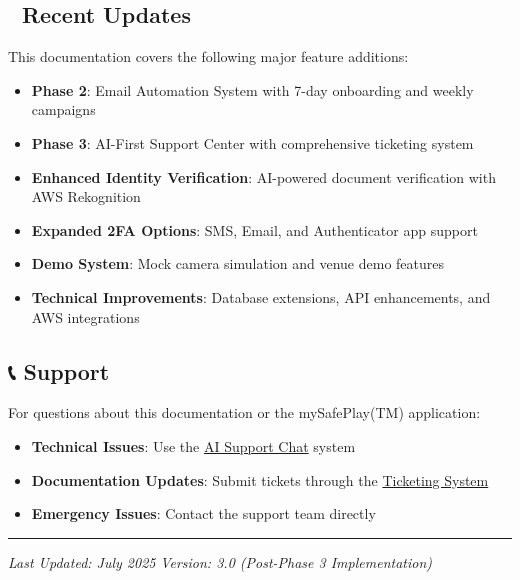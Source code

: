 \documentclass[11pt,a4paper]{article}
\begin{document}
\hypertarget{recent-updates}{%
\subsection{🔄 Recent Updates}\label{recent-updates}}

This documentation covers the following major feature additions:

\begin{itemize}
\tightlist
\item
  \textbf{Phase 2}: Email Automation System with 7-day onboarding and
  weekly campaigns
\item
  \textbf{Phase 3}: AI-First Support Center with comprehensive ticketing
  system
\item
  \textbf{Enhanced Identity Verification}: AI-powered document
  verification with AWS Rekognition
\item
  \textbf{Expanded 2FA Options}: SMS, Email, and Authenticator app
  support
\item
  \textbf{Demo System}: Mock camera simulation and venue demo features
\item
  \textbf{Technical Improvements}: Database extensions, API
  enhancements, and AWS integrations
\end{itemize}

\hypertarget{support}{%
\subsection{📞 Support}\label{support}}

For questions about this documentation or the mySafePlay(TM)
application:

\begin{itemize}
\tightlist
\item
  \textbf{Technical Issues}: Use the \href{./support/ai-chat.md}{AI
  Support Chat} system
\item
  \textbf{Documentation Updates}: Submit tickets through the
  \href{./support/ticketing-system.md}{Ticketing System}
\item
  \textbf{Emergency Issues}: Contact the support team directly
\end{itemize}

\begin{center}\rule{0.5\linewidth}{0.5pt}\end{center}

\emph{Last Updated: July 2025} \emph{Version: 3.0 (Post-Phase 3
Implementation)}
\end{document}
